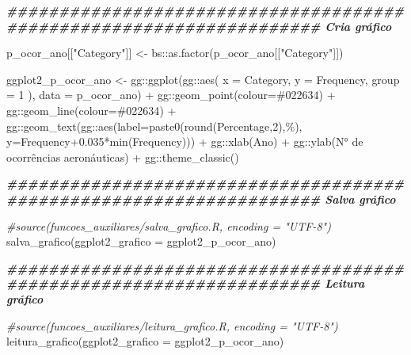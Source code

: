 \documentclass[
]{article}
\newenvironment{Shaded}{\begin{snugshade}}{\end{snugshade}}
\newcommand{\AttributeTok}[1]{\textcolor[rgb]{0.77,0.63,0.00}{#1}}
\newcommand{\CommentTok}[1]{\textcolor[rgb]{0.56,0.35,0.01}{\textit{#1}}}
\newcommand{\DecValTok}[1]{\textcolor[rgb]{0.00,0.00,0.81}{#1}}
\newcommand{\DocumentationTok}[1]{\textcolor[rgb]{0.56,0.35,0.01}{\textbf{\textit{#1}}}}
\newcommand{\FloatTok}[1]{\textcolor[rgb]{0.00,0.00,0.81}{#1}}
\newcommand{\FunctionTok}[1]{\textcolor[rgb]{0.00,0.00,0.00}{#1}}
\newcommand{\NormalTok}[1]{#1}
\newcommand{\OtherTok}[1]{\textcolor[rgb]{0.56,0.35,0.01}{#1}}
\newcommand{\SpecialCharTok}[1]{\textcolor[rgb]{0.00,0.00,0.00}{#1}}
\newcommand{\StringTok}[1]{\textcolor[rgb]{0.31,0.60,0.02}{#1}}
\begin{document}
\begin{Shaded}
\begin{Highlighting}[]
\DocumentationTok{\#\#\#\#\#\#\#\#\#\#\#\#\#\#\#\#\#\#\#\#\#\#\#\#\#\#\#\#\#\#\#\#\#\#\#\#\#\#\#\#\#\#\#\#\#\#\#\#\#\#\#\#\#\#\#\#\#\#\#\#\#\#\#\#\#\#\#\# Cria gráfico}

\NormalTok{p\_ocor\_ano[[}\StringTok{"Category"}\NormalTok{]] }\OtherTok{\textless{}{-}}\NormalTok{ bs}\SpecialCharTok{::}\FunctionTok{as.factor}\NormalTok{(p\_ocor\_ano[[}\StringTok{"Category"}\NormalTok{]])}

\NormalTok{ggplot2\_p\_ocor\_ano }\OtherTok{\textless{}{-}}\NormalTok{ gg}\SpecialCharTok{::}\FunctionTok{ggplot}\NormalTok{(gg}\SpecialCharTok{::}\FunctionTok{aes}\NormalTok{(}
    \AttributeTok{x =}\NormalTok{ Category,}
    \AttributeTok{y =}\NormalTok{ Frequency,}
    \AttributeTok{group =} \DecValTok{1}
\NormalTok{), }\AttributeTok{data =}\NormalTok{ p\_ocor\_ano) }\SpecialCharTok{+}
\NormalTok{    gg}\SpecialCharTok{::}\FunctionTok{geom\_point}\NormalTok{(}\AttributeTok{colour=}\StringTok{\textquotesingle{}\#022634\textquotesingle{}}\NormalTok{) }\SpecialCharTok{+}
\NormalTok{    gg}\SpecialCharTok{::}\FunctionTok{geom\_line}\NormalTok{(}\AttributeTok{colour=}\StringTok{\textquotesingle{}\#022634\textquotesingle{}}\NormalTok{) }\SpecialCharTok{+}
\NormalTok{    gg}\SpecialCharTok{::}\FunctionTok{geom\_text}\NormalTok{(gg}\SpecialCharTok{::}\FunctionTok{aes}\NormalTok{(}\AttributeTok{label=}\FunctionTok{paste0}\NormalTok{(}\FunctionTok{round}\NormalTok{(Percentage,}\DecValTok{2}\NormalTok{),}\StringTok{\textquotesingle{}\%\textquotesingle{}}\NormalTok{),}
                  \AttributeTok{y=}\NormalTok{Frequency}\FloatTok{+0.035}\SpecialCharTok{*}\FunctionTok{min}\NormalTok{(Frequency))) }\SpecialCharTok{+}
\NormalTok{    gg}\SpecialCharTok{::}\FunctionTok{xlab}\NormalTok{(}\StringTok{\textquotesingle{}Ano\textquotesingle{}}\NormalTok{) }\SpecialCharTok{+}
\NormalTok{    gg}\SpecialCharTok{::}\FunctionTok{ylab}\NormalTok{(}\StringTok{\textquotesingle{}N° de ocorrências aeronáuticas\textquotesingle{}}\NormalTok{) }\SpecialCharTok{+}
\NormalTok{    gg}\SpecialCharTok{::}\FunctionTok{theme\_classic}\NormalTok{() }

\DocumentationTok{\#\#\#\#\#\#\#\#\#\#\#\#\#\#\#\#\#\#\#\#\#\#\#\#\#\#\#\#\#\#\#\#\#\#\#\#\#\#\#\#\#\#\#\#\#\#\#\#\#\#\#\#\#\#\#\#\#\#\#\#\#\#\#\#\#\#\#\# Salva gráfico}

\CommentTok{\#source(\textquotesingle{}funcoes\_auxiliares/salva\_grafico.R\textquotesingle{}, encoding = "UTF{-}8")}
\FunctionTok{salva\_grafico}\NormalTok{(}\AttributeTok{ggplot2\_grafico =}\NormalTok{ ggplot2\_p\_ocor\_ano)}

\DocumentationTok{\#\#\#\#\#\#\#\#\#\#\#\#\#\#\#\#\#\#\#\#\#\#\#\#\#\#\#\#\#\#\#\#\#\#\#\#\#\#\#\#\#\#\#\#\#\#\#\#\#\#\#\#\#\#\#\#\#\#\#\#\#\#\#\#\#\#\#\# Leitura gráfico}

\CommentTok{\#source(\textquotesingle{}funcoes\_auxiliares/leitura\_grafico.R\textquotesingle{}, encoding = "UTF{-}8")}
\FunctionTok{leitura\_grafico}\NormalTok{(}\AttributeTok{ggplot2\_grafico =}\NormalTok{ ggplot2\_p\_ocor\_ano)}
\end{Highlighting}
\end{Shaded}
\end{document}
